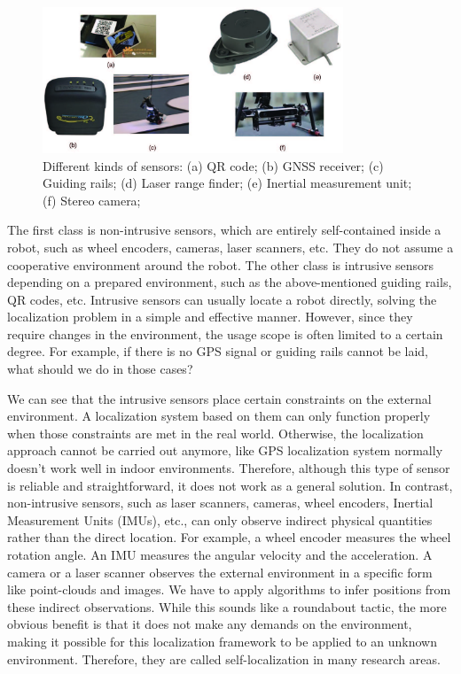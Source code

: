 \begin{figure}
	\centering
	\includegraphics[width=0.8\textwidth]{./resources/whatIsSLAM/sensors.jpg}
	\caption{Different kinds of sensors: (a) QR code; (b) GNSS receiver; (c) Guiding rails; (d) Laser range finder; (e) Inertial measurement unit; (f) Stereo camera; }
	\label{fig:sensors}
\end{figure}

The first class is non-intrusive sensors, which are entirely self-contained inside a robot, such as wheel encoders, cameras, laser scanners, etc. They do not assume a cooperative environment around the robot. The other class is intrusive sensors depending on a prepared environment, such as the above-mentioned guiding rails, QR codes, etc. Intrusive sensors can usually locate a robot directly, solving the localization problem in a simple and effective manner. However, since they require changes in the environment, the usage scope is often limited to a certain degree. For example, if there is no GPS signal or guiding rails cannot be laid, what should we do in those cases?

We can see that the intrusive sensors place certain constraints on the external environment. A localization system based on them can only function properly when those constraints are met in the real world. Otherwise, the localization approach cannot be carried out anymore, like GPS localization system normally doesn't work well in indoor environments. Therefore, although this type of sensor is reliable and straightforward, it does not work as a general solution. In contrast, non-intrusive sensors, such as laser scanners, cameras, wheel encoders, Inertial Measurement Units (IMUs), etc., can only observe indirect physical quantities rather than the direct location. For example, a wheel encoder measures the wheel rotation angle. An IMU measures the angular velocity and the acceleration. A camera or a laser scanner observes the external environment in a specific form like point-clouds and images. We have to apply algorithms to infer positions from these indirect observations. While this sounds like a roundabout tactic, the more obvious benefit is that it does not make any demands on the environment, making it possible for this localization framework to be applied to an unknown environment. Therefore, they are called self-localization in many research areas.

